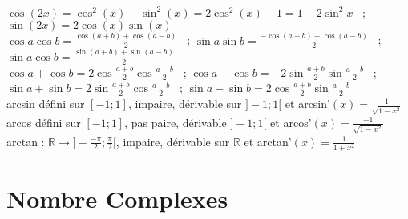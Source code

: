 \documentclass[12 pt]{book}
\begin{document}
\begin{flushleft}
\begin{doublespace}
	\text{ } \\
	$ \cos(2x) = \cos^2(x) - \sin^2(x) = 2 \cos^2(x) - 1 = 1- 2 \sin^2{x}$ \ ; $\sin(2x)= 2 \cos(x) \sin(x)$ \\
	$ \cos a \cos b = \frac{\cos(a+b) + \cos(a-b)}{2}$ \ ; $\sin a \sin b = \frac{- \cos(a+b) + \cos(a-b)}{2}$ \ ; $\sin a \cos b = \frac{\sin(a+b) + \sin(a-b)}{2}$ \\
	$ \cos a + \cos b = 2 \cos \frac{a+b}{2} \cos \frac{a-b}{2}$ \ ; $\cos a - \cos b = -2 \sin \frac{a+b}{2} \sin \frac{a-b}{2}$ \ ; $\sin a + \sin b = 2 \sin \frac{a+b}{2} \cos \frac{a-b}{2}$ \ ; $\sin a - \sin b = 2 \cos\frac{a+b}{2} \sin\frac{a-b}{2}$ \\
	arcsin défini sur $[-1;1]$, impaire, dérivable sur $]-1;1[ $ et arcsin'$(x) = \frac{1}{\sqrt{1-x^2}}$ \\
	arcos défini sur $[-1;1]$, pas paire, dérivable $]-1;1[$ et arcos'$(x) = \frac{-1}{\sqrt{1-x^2}}$ \\
	arctan : $\mathbb{R} \rightarrow ]-\frac{-\pi}{2} ; \frac{\pi}{2}[$, impaire, dérivable sur $\mathbb{R}$ et arctan'$(x) = \frac{1}{1+x^2}$\\

\end{doublespace}
\end{flushleft}

\section*{Nombre Complexes}
\end{document}
